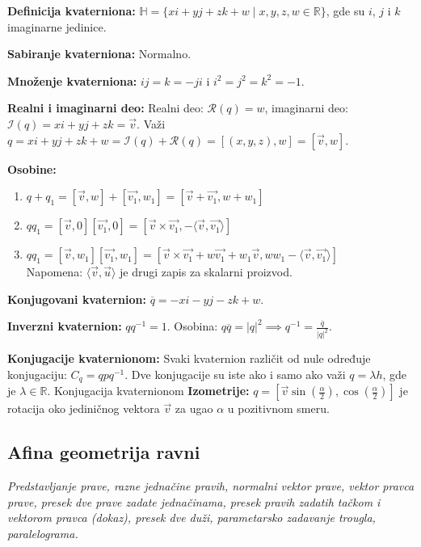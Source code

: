 \documentclass[12pt]{article}
\newcommand{\vek}[1]{\overrightarrow{#1}}
\begin{document}
\textbf{Definicija kvaterniona:}
$\mathbb{H}=\{xi+yj+zk+w\mid x,y,z,w\in\mathbb{R}\}$, gde su $i$, $j$ i $k$
imaginarne jedinice.
\par

\textbf{Sabiranje kvaterniona:} Normalno.
\par

\textbf{Množenje kvaterniona:} $i j=k=-j i$ i $i^2=j^2=k^2=-1$.
\par

\textbf{Realni i imaginarni deo:} Realni deo: $\mathcal{R}(q)=w$, imaginarni
deo: $\mathcal{I}(q)=x i +y j +z k=\vek{v}$. Važi
$q=xi+yj+zk+w=\mathcal{I}(q)+\mathcal{R}(q)=[(x,y,z),w]=[\vek{v},w]$.
\par

\textbf{Osobine:}
\begin{enumerate}[label=\textbf{(\arabic*)}]
    \item $q+q_1=[\vek{v},w]+[\vek{v_1},w_1]=[\vek{v}+\vek{v_1},w+w_1]$
    \item $q q_1=[\vek{v},0][\vek{v_1},0]=[\vek{v}\times\vek{v_1},-\langle\vek{v},\vek{v_1}\rangle]$
    \item $q q_1=[\vek{v},w_1][\vek{v_1},w_1]=[\vek{v}\times\vek{v_1}+w \vek{v_1}+w_1\vek{v},w w_1-\langle\vek{v},\vek{v_1}\rangle]$\\
          Napomena: $\langle\vek{v},\vek{u}\rangle$ je drugi zapis za skalarni proizvod.
\end{enumerate}

\textbf{Konjugovani kvaternion:} $\overline{q}=-x i -y j -z k+w$.
\par

\textbf{Inverzni kvaternion:} $q q^{-1}=1$. Osobina:
$q \overline{q}=|q|^2 \implies q^{-1}=\frac{\overline{q}}{|q|^2}$.
\par

\textbf{Konjugacije kvaternionom:} Svaki kvaternion različit od nule određuje
konjugaciju: $C_q=qpq^{-1}$. Dve konjugacije su iste ako i samo ako važi
$q=\lambda h$, gde je $\lambda\in\mathbb{R}$. Konjugacija kvaternionom
\textbf{Izometrije:} $q=[\vek{v}\sin(\frac{\alpha}{2}),\cos(\frac{\alpha}{2})]$
je rotacija oko jediničnog vektora $\vek{v}$ za ugao $\alpha$ u pozitivnom
smeru.
\par

\subsection{Afina geometrija ravni}
\textit{Predstavljanje prave, razne jednačine pravih, normalni vektor prave,
    vektor pravca prave, presek dve prave zadate jednačinama, presek pravih
    zadatih tačkom i vektorom pravca (dokaz), presek dve duži, parametarsko
    zadavanje trougla, paralelograma.}
\par
\vspace*{1cm}
\end{document}
